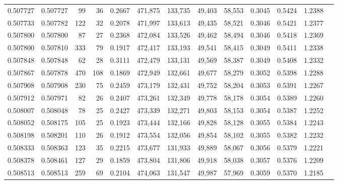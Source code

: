 \begin{tabular}{rrrrrrrrrrrrr}
0.507727 & 0.507727 &    99 &    36 &                                     0.2667 & 471,875 & 133,735 &  49,403 &  58,553 & 0.3045 & 0.5424 & 1.2388 \\
0.507733 & 0.507782 &   122 &    32 &                                     0.2078 & 471,997 & 133,613 &  49,435 &  58,521 & 0.3046 & 0.5421 & 1.2377 \\
0.507800 & 0.507800 &    87 &    27 &                                     0.2368 & 472,084 & 133,526 &  49,462 &  58,494 & 0.3046 & 0.5418 & 1.2369 \\
0.507800 & 0.507810 &   333 &    79 &                                     0.1917 & 472,417 & 133,193 &  49,541 &  58,415 & 0.3049 & 0.5411 & 1.2338 \\
0.507848 & 0.507848 &    62 &    28 &                                     0.3111 & 472,479 & 133,131 &  49,569 &  58,387 & 0.3049 & 0.5408 & 1.2332 \\
0.507867 & 0.507878 &   470 &   108 &                                     0.1869 & 472,949 & 132,661 &  49,677 &  58,279 & 0.3052 & 0.5398 & 1.2288 \\
0.507908 & 0.507908 &   230 &    75 &                                     0.2459 & 473,179 & 132,431 &  49,752 &  58,204 & 0.3053 & 0.5391 & 1.2267 \\
0.507912 & 0.507971 &    82 &    26 &                                     0.2407 & 473,261 & 132,349 &  49,778 &  58,178 & 0.3054 & 0.5389 & 1.2260 \\
0.508007 & 0.508048 &    78 &    25 &                                     0.2427 & 473,339 & 132,271 &  49,803 &  58,153 & 0.3054 & 0.5387 & 1.2252 \\
0.508052 & 0.508175 &   105 &    25 &                                     0.1923 & 473,444 & 132,166 &  49,828 &  58,128 & 0.3055 & 0.5384 & 1.2243 \\
0.508198 & 0.508201 &   110 &    26 &                                     0.1912 & 473,554 & 132,056 &  49,854 &  58,102 & 0.3055 & 0.5382 & 1.2232 \\
0.508333 & 0.508363 &   123 &    35 &                                     0.2215 & 473,677 & 131,933 &  49,889 &  58,067 & 0.3056 & 0.5379 & 1.2221 \\
0.508378 & 0.508461 &   127 &    29 &                                     0.1859 & 473,804 & 131,806 &  49,918 &  58,038 & 0.3057 & 0.5376 & 1.2209 \\
0.508513 & 0.508513 &   259 &    69 &                                     0.2104 & 474,063 & 131,547 &  49,987 &  57,969 & 0.3059 & 0.5370 & 1.2185 \\

\end{tabular}
